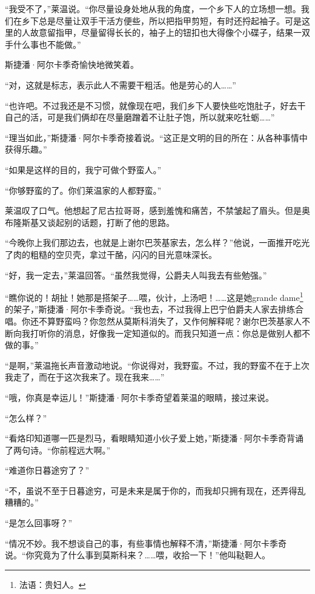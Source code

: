 \par “我受不了，”莱温说。“你尽量设身处地从我的角度，一个乡下人的立场想一想。我们在乡下总是尽量让双手干活方便些，所以把指甲剪短，有时还捋起袖子。可是这里的人故意留指甲，尽量留得长长的，袖子上的钮扣也大得像个小碟子，结果一双手什么事也不能做。”
\par 斯捷潘·阿尔卡季奇愉快地微笑着。
\par “对，这就是标志，表示此人不需要干粗活。他是劳心的人……”
\par “也许吧。不过我还是不习惯，就像现在吧，我们乡下人要快些吃饱肚子，好去干自己的活，可是我们俩却在尽量磨蹭着不让肚子饱，所以就来吃牡蛎……”
\par “理当如此，”斯捷潘·阿尔卡季奇接着说。“这正是文明的目的所在：从各种事情中获得乐趣。”
\par “如果是这样的目的，我宁可做个野蛮人。”
\par “你够野蛮的了。你们莱温家的人都野蛮。”
\par 莱温叹了口气。他想起了尼古拉哥哥，感到羞愧和痛苦，不禁皱起了眉头。但是奥布隆斯基又谈起别的话题，打断了他的思路。
\par “今晚你上我们那边去，也就是上谢尔巴茨基家去，怎么样？”他说，一面推开吃光了肉的粗糙的空贝壳，拿过干酪，闪闪的目光意味深长。
\par “好，我一定去，”莱温回答。“虽然我觉得，公爵夫人叫我去有些勉强。”
\par “瞧你说的！胡扯！她那是搭架子……喂，伙计，上汤吧！……这是她grande dame\footnote{法语：贵妇人。}的架子，”斯捷潘·阿尔卡季奇说。“我也去，不过我得上巴宁伯爵夫人家去排练合唱。你还不算野蛮吗？你忽然从莫斯科消失了，又作何解释呢？谢尔巴茨基家人不断向我打听你的消息，好像我一定知道似的。而我只知道一点：你总是做别人都不做的事。”
\par “是啊，”莱温拖长声音激动地说。“你说得对，我野蛮。不过，我的野蛮不在于上次我走了，而在于这次我来了。现在我来……”
\par “哦，你真是幸运儿！”斯捷潘·阿尔卡季奇望着莱温的眼睛，接过来说。
\par “怎么样？”
\par “看烙印知道哪一匹是烈马，看眼睛知道小伙子爱上她，”斯捷潘·阿尔卡季奇背诵了两句诗。“你前程远大啊。”
\par “难道你日暮途穷了？”
\par “不，虽说不至于日暮途穷，可是未来是属于你的，而我却只拥有现在，还弄得乱糟糟的。”
\par “是怎么回事呀？”
\par “情况不妙。我不想谈自己的事，有些事情也解释不清，”斯捷潘·阿尔卡季奇说。“你究竟为了什么事到莫斯科来？……喂，收拾一下！”他叫鞑靼人。

